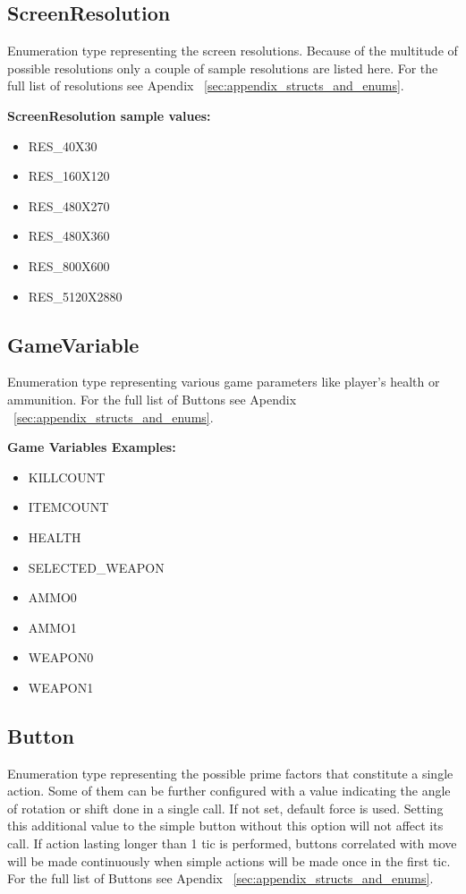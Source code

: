 \subsection{ScreenResolution} \label{subsec:screenresolution}

	Enumeration type representing the screen resolutions. Because of the multitude of possible resolutions only a couple of sample resolutions are listed here. For the full list of resolutions see Apendix ~\ref{sec:appendix_structs_and_enums}.


\vspace{20pt}
\textbf{ScreenResolution sample values:}
\begin{itemize}
\item RES\_40X30
\item RES\_160X120	
\item RES\_480X270	
\item RES\_480X360	
\item RES\_800X600
\item RES\_5120X2880
\end{itemize}

\subsection{GameVariable} \label{subsec:gamevar}
Enumeration type representing various game parameters like player's health or ammunition. For the full list of Buttons see Apendix ~\ref{sec:appendix_structs_and_enums}.


\vspace{20pt}
\textbf{Game Variables Examples:}
\begin{itemize}
	\item KILLCOUNT
	\item ITEMCOUNT
	\item HEALTH
	\item SELECTED\_WEAPON
	\item AMMO0
	\item AMMO1
	\item WEAPON0
	\item WEAPON1
\end{itemize}

\subsection{Button} \label{subsec:button}

	Enumeration type representing the possible prime factors that constitute a single action. Some of them can be further configured with a value indicating the angle of rotation or shift done in a single call. If not set, default force is used. Setting this additional value to the simple button without this option will not affect its call. If action lasting longer than 1 tic is performed, buttons correlated with move will be made continuously when simple actions will be made once in the first tic. For the full list of Buttons see Apendix ~\ref{sec:appendix_structs_and_enums}.


